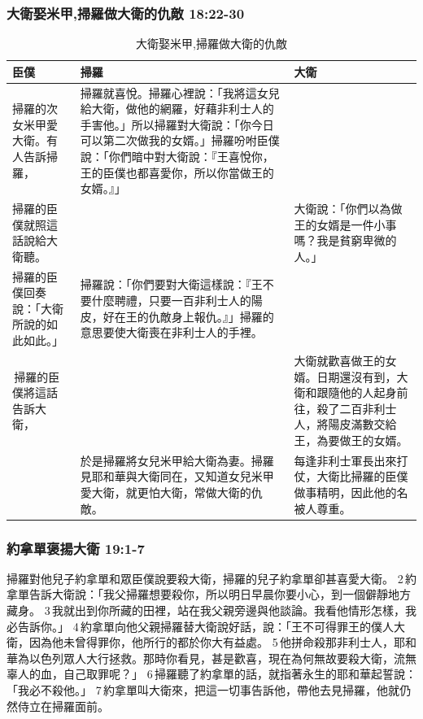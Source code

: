 \subsubsection{大衛娶米甲,掃羅做大衛的仇敵 18:22-30}
\begin{table}[H]
\centering 
\begin{tabular}{p{3cm}|p{8cm}|p{}}\hline\hline
臣僕&掃羅&大衛\\\hline
掃羅的次女米甲愛大衛。有人告訴掃羅，&掃羅就喜悅。掃羅心裡說：「我將這女兒給大衛，做他的網羅，好藉非利士人的手害他。」所以掃羅對大衛說：「你今日可以第二次做我的女婿。」掃羅吩咐臣僕說：「你們暗中對大衛說：『王喜悅你，王的臣僕也都喜愛你，所以你當做王的女婿。』」 & \\\hline
掃羅的臣僕就照這話說給大衛聽。&&大衛說：「你們以為做王的女婿是一件小事嗎？我是貧窮卑微的人。」 \\\hline
掃羅的臣僕回奏說：「大衛所說的如此如此。」&掃羅說：「你們要對大衛這樣說：『王不要什麼聘禮，只要一百非利士人的陽皮，好在王的仇敵身上報仇。』」掃羅的意思要使大衛喪在非利士人的手裡。&\\\hline
 掃羅的臣僕將這話告訴大衛，&&大衛就歡喜做王的女婿。日期還沒有到，大衛和跟隨他的人起身前往，殺了二百非利士人，將陽皮滿數交給王，為要做王的女婿。\\\hline
&於是掃羅將女兒米甲給大衛為妻。掃羅見耶和華與大衛同在，又知道女兒米甲愛大衛，就更怕大衛，常做大衛的仇敵。&每逢非利士軍長出來打仗，大衛比掃羅的臣僕做事精明，因此他的名被人尊重。\\\hline
\end{tabular}
\caption{大衛娶米甲,掃羅做大衛的仇敵}
\end{table}

\subsubsection{約拿單褒揚大衛 19:1-7}
掃羅對他兒子約拿單和眾臣僕說要殺大衛，掃羅的兒子約拿單卻甚喜愛大衛。 2 約拿單告訴大衛說：「我父掃羅想要殺你，所以明日早晨你要小心，到一個僻靜地方藏身。 3 我就出到你所藏的田裡，站在我父親旁邊與他談論。我看他情形怎樣，我必告訴你。」 4 約拿單向他父親掃羅替大衛說好話，說：「王不可得罪王的僕人大衛，因為他未曾得罪你，他所行的都於你大有益處。 5 他拼命殺那非利士人，耶和華為以色列眾人大行拯救。那時你看見，甚是歡喜，現在為何無故要殺大衛，流無辜人的血，自己取罪呢？」 6 掃羅聽了約拿單的話，就指著永生的耶和華起誓說：「我必不殺他。」 7 約拿單叫大衛來，把這一切事告訴他，帶他去見掃羅，他就仍然侍立在掃羅面前。

